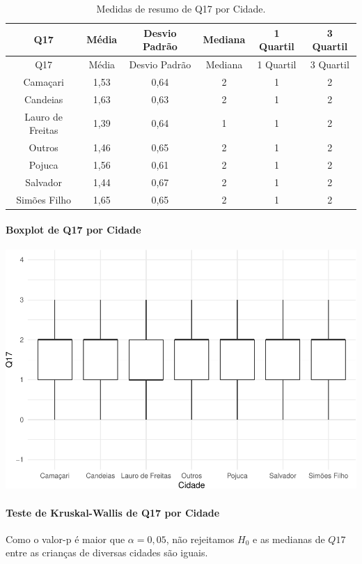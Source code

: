 \documentclass[]{article}
\let\oldparagraph\paragraph
\renewcommand{\paragraph}[1]{\oldparagraph{#1}\mbox{}}
\begin{document}
\begin{longtable}[]{@{}cccccc@{}}
\caption{\label{tab:unnamed-chunk-184}Medidas de resumo de Q17 por Cidade.}\tabularnewline
\toprule
Q17 & Média & Desvio Padrão & Mediana & 1 Quartil & 3 Quartil\tabularnewline
\midrule
\endfirsthead
\toprule
Q17 & Média & Desvio Padrão & Mediana & 1 Quartil & 3 Quartil\tabularnewline
\midrule
\endhead
Camaçari & 1,53 & 0,64 & 2 & 1 & 2\tabularnewline
Candeias & 1,63 & 0,63 & 2 & 1 & 2\tabularnewline
Lauro de Freitas & 1,39 & 0,64 & 1 & 1 & 2\tabularnewline
Outros & 1,46 & 0,65 & 2 & 1 & 2\tabularnewline
Pojuca & 1,56 & 0,61 & 2 & 1 & 2\tabularnewline
Salvador & 1,44 & 0,67 & 2 & 1 & 2\tabularnewline
Simões Filho & 1,65 & 0,65 & 2 & 1 & 2\tabularnewline
\bottomrule
\end{longtable}

\hypertarget{boxplot-de-q17-por-cidade}{%
\paragraph{Boxplot de Q17 por Cidade}\label{boxplot-de-q17-por-cidade}}

\begin{center}\includegraphics[width=0.75\linewidth]{relatorio_files/figure-latex/unnamed-chunk-185-1} \end{center}

\hypertarget{teste-de-kruskal-wallis-de-q17-por-cidade}{%
\paragraph{Teste de Kruskal-Wallis de Q17 por Cidade}\label{teste-de-kruskal-wallis-de-q17-por-cidade}}

Como o valor-p é maior que \(\alpha=0,05\), não rejeitamos \(H_0\) e as medianas de \(Q17\) entre as crianças de diversas cidades são iguais.
\end{document}
